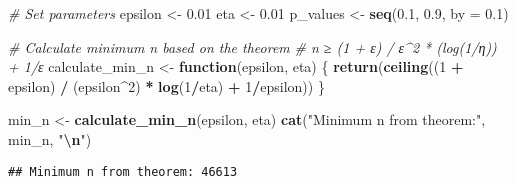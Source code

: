 \documentclass[
]{article}
\newenvironment{Shaded}{\begin{snugshade}}{\end{snugshade}}
\newcommand{\AttributeTok}[1]{\textcolor[rgb]{0.13,0.29,0.53}{#1}}
\newcommand{\CommentTok}[1]{\textcolor[rgb]{0.56,0.35,0.01}{\textit{#1}}}
\newcommand{\ControlFlowTok}[1]{\textcolor[rgb]{0.13,0.29,0.53}{\textbf{#1}}}
\newcommand{\DecValTok}[1]{\textcolor[rgb]{0.00,0.00,0.81}{#1}}
\newcommand{\FloatTok}[1]{\textcolor[rgb]{0.00,0.00,0.81}{#1}}
\newcommand{\FunctionTok}[1]{\textcolor[rgb]{0.13,0.29,0.53}{\textbf{#1}}}
\newcommand{\NormalTok}[1]{#1}
\newcommand{\OtherTok}[1]{\textcolor[rgb]{0.56,0.35,0.01}{#1}}
\newcommand{\SpecialCharTok}[1]{\textcolor[rgb]{0.81,0.36,0.00}{\textbf{#1}}}
\newcommand{\StringTok}[1]{\textcolor[rgb]{0.31,0.60,0.02}{#1}}
\begin{document}
\begin{Shaded}
\begin{Highlighting}[]
\CommentTok{\# Set parameters}
\NormalTok{epsilon }\OtherTok{\textless{}{-}} \FloatTok{0.01}
\NormalTok{eta }\OtherTok{\textless{}{-}} \FloatTok{0.01}
\NormalTok{p\_values }\OtherTok{\textless{}{-}} \FunctionTok{seq}\NormalTok{(}\FloatTok{0.1}\NormalTok{, }\FloatTok{0.9}\NormalTok{, }\AttributeTok{by =} \FloatTok{0.1}\NormalTok{)}

\CommentTok{\# Calculate minimum n based on the theorem}
\CommentTok{\# n ≥ (1 + ε) / ε\^{}2 * (log(1/η)) + 1/ε}
\NormalTok{calculate\_min\_n }\OtherTok{\textless{}{-}} \ControlFlowTok{function}\NormalTok{(epsilon, eta) \{}
  \FunctionTok{return}\NormalTok{(}\FunctionTok{ceiling}\NormalTok{((}\DecValTok{1} \SpecialCharTok{+}\NormalTok{ epsilon) }\SpecialCharTok{/}\NormalTok{ (epsilon}\SpecialCharTok{\^{}}\DecValTok{2}\NormalTok{) }\SpecialCharTok{*} \FunctionTok{log}\NormalTok{(}\DecValTok{1}\SpecialCharTok{/}\NormalTok{eta) }\SpecialCharTok{+} \DecValTok{1}\SpecialCharTok{/}\NormalTok{epsilon))}
\NormalTok{\}}

\NormalTok{min\_n }\OtherTok{\textless{}{-}} \FunctionTok{calculate\_min\_n}\NormalTok{(epsilon, eta)}
\FunctionTok{cat}\NormalTok{(}\StringTok{"Minimum n from theorem:"}\NormalTok{, min\_n, }\StringTok{"}\SpecialCharTok{\textbackslash{}n}\StringTok{"}\NormalTok{)}
\end{Highlighting}
\end{Shaded}

\begin{verbatim}
## Minimum n from theorem: 46613
\end{verbatim}
\end{document}
